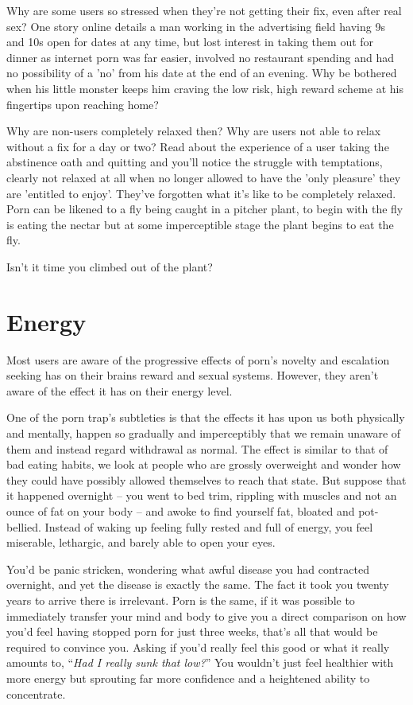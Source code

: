 \documentclass[
]{book}
\begin{document}
Why are some users so stressed when they're not getting their fix, even after real sex? One story online details a man working in the advertising field having 9s and 10s open for dates at any time, but lost interest in taking them out for dinner as internet porn was far easier, involved no restaurant spending and had no possibility of a 'no' from his date at the end of an evening. Why be bothered when his little monster keeps him craving the low risk, high reward scheme at his fingertips upon reaching home?

Why are non-users completely relaxed then? Why are users not able to relax without a fix for a day or two? Read about the experience of a user taking the abstinence oath and quitting and you'll notice the struggle with temptations, clearly not relaxed at all when no longer allowed to have the 'only pleasure' they are 'entitled to enjoy'. They've forgotten what it's like to be completely relaxed. Porn can be likened to a fly being caught in a pitcher plant, to begin with the fly is eating the nectar but at some imperceptible stage the plant begins to eat the fly.

Isn't it time you climbed out of the plant?

\hypertarget{energy}{%
\section{Energy}\label{energy}}

Most users are aware of the progressive effects of porn's novelty and escalation seeking has on their brains reward and sexual systems. However, they aren't aware of the effect it has on their energy level.

One of the porn trap's subtleties is that the effects it has upon us both physically and mentally, happen so gradually and imperceptibly that we remain unaware of them and instead regard withdrawal as normal. The effect is similar to that of bad eating habits, we look at people who are grossly overweight and wonder how they could have possibly allowed themselves to reach that state. But suppose that it happened overnight -- you went to bed trim, rippling with muscles and not an ounce of fat on your body -- and awoke to find yourself fat, bloated and pot-bellied. Instead of waking up feeling fully rested and full of energy, you feel miserable, lethargic, and barely able to open your eyes.

You'd be panic stricken, wondering what awful disease you had contracted overnight, and yet the disease is exactly the same. The fact it took you twenty years to arrive there is irrelevant. Porn is the same, if it was possible to immediately transfer your mind and body to give you a direct comparison on how you'd feel having stopped porn for just three weeks, that's all that would be required to convince you. Asking if you'd really feel this good or what it really amounts to, ``\emph{Had I really sunk that low?}'' You wouldn't just feel healthier with more energy but sprouting far more confidence and a heightened ability to concentrate.
\end{document}
